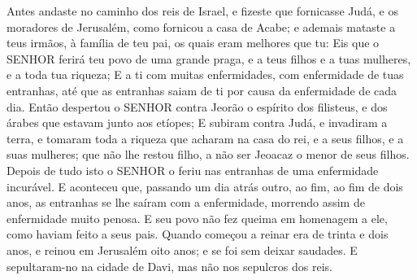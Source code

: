 {{{{  Antes andaste no caminho dos reis de Israel, e fizeste que fornicasse Judá, e os moradores de Jerusalém, como fornicou a casa de Acabe; e ademais mataste a teus irmãos, à família de teu pai, os quais eram melhores que tu:
  Eis que o SENHOR ferirá teu povo de uma grande praga, e a teus filhos e a tuas mulheres, e a toda tua riqueza;
  E a ti com muitas enfermidades, com enfermidade de tuas entranhas, até que as entranhas saiam de ti por causa da enfermidade de cada dia}}}.
  Então despertou o SENHOR contra Jeorão o espírito dos filisteus, e dos árabes que estavam junto aos etíopes;
  E subiram contra Judá, e invadiram a terra, e tomaram toda a riqueza que acharam na casa do rei, e a seus filhos, e a suas mulheres; que não lhe restou filho, a não ser Jeoacaz o menor de seus filhos.
  Depois de tudo isto o SENHOR o feriu nas entranhas de uma enfermidade incurável.
  E aconteceu que, passando um dia atrás outro, ao fim, ao fim de dois anos, as entranhas se lhe saíram com a enfermidade, morrendo assim de enfermidade muito penosa. E seu povo não fez queima em homenagem a ele, como haviam feito a seus pais.
  Quando começou a reinar era de trinta e dois anos, e reinou em Jerusalém oito anos; e se foi sem deixar saudades. E sepultaram-no na cidade de Davi, mas não nos sepulcros dos reis.
\par }

